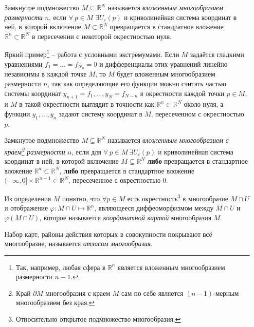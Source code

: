 \begin{to_def} 
    Замкнутое подмножество $M \subseteq \mathbb{R}^N$ называется \textit{вложенным многообразием размерности} $n$, если $\forall \ p \in M$ $\exists U_{\varepsilon}(p)$ и криволинейная система координат в ней, в которой включение $M \subset \mathbb{R}^N$ превращается в стандратное вложение $\mathbb{R}^n \subset \mathbb{R}^N$
    в пересечении с некоторой окрестностью нуля.
\end{to_def}

Яркий пример\footnote{
    Так, например, любая сфера в $\mathbb{R}^n$ является вложенным многообразием размерности $n-1$.
} -- работа с условными экстремумами. Если $M$ задаётся гладкими уравнениями $f_1 = \ldots = f_{N_n} = 0$ и дифференциалы этих уравнений линейно независимы в каждой точке $M$, то $M$ будет вложенным многообразием размерности $n$, так как определяющие его функции можно считать частью системы координат $y_{n+1}=f_1,\ldots,y_N=f_{N-n}$ в окрестности каждой точки $p \in M$, и $M$ в такой окрестности выглядит в точности как $\mathbb{R}^n \subset \mathbb{R}^N$ около нуля, а функции $y_1,\ldots,y_n$ задают систему координат в $M$, пересеченном с окрестностью $p$.


\begin{to_def} 
    Замкнутое подмножество $M \subseteq \mathbb{R}^N$ называется \textit{вложенным многообразием с краем\footnote{
        Край $\partial M$ многообразия с краем $M$ сам по себе является $(n-1)$-мерным многообразием без края.
    } размерности} $n$, если для $\forall \ p \in M \ \exists U_{\varepsilon}(p)$ и криволинейная система координат в ней, в которой включение $M \subseteq \mathbb{R}^N$ \textbf{либо} превращается в стандартное вложение $\mathbb{R}^n \subset \mathbb{R}^N$, \textbf{либо} превращается в стандартное вложение $(-\infty, 0] \times \mathbb{R}^{n-1} \subset \mathbb{R}^N$, пересеченное с окрестностью 0.
\end{to_def}


\begin{to_def} 
    Из определения $M$ понятно, что $\forall p \in M$  есть окрестность\footnote{
        Относительно открытое подмножество многообразия. 
    } в многообразие $M \cap U$ и отображение $\varphi \colon M \cap U \mapsto \mathbb{R}^n$, являющееся диффеоморфизмом между $M \cap U$ и $\varphi(M \cap U)$, которое называется \textit{координатной картой} многообразия $M$.
\end{to_def}


\begin{to_def} 
    Набор карт, районы действия которых в совокупности покрывают всё многообразие, называется \textit{атласом многообразия}. 
\end{to_def}

